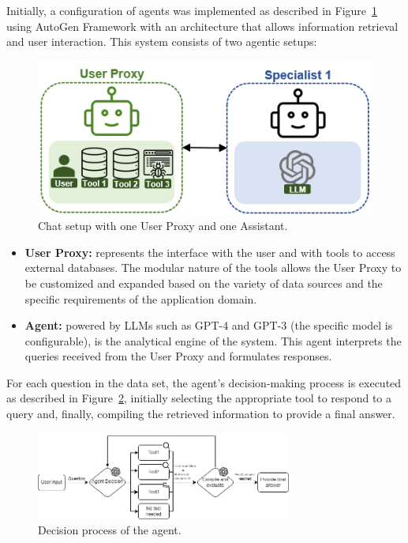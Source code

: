             Initially, a configuration of agents was implemented as described in Figure~\ref{fig:agent_config_1} using AutoGen Framework \citep{Wu2023} with an architecture that allows information retrieval and user interaction. This system consists of two agentic setups:

            \begin{figure}[h]
                \centering
                \includegraphics[width=.5\textwidth]{images/agent_config_1.png}
                \caption{Chat setup with one User Proxy \citep{Wu2023} and one Assistant.}
                \label{fig:agent_config_1}
            \end{figure}

            \begin{itemize}        
                        
                \item \textbf{User Proxy:} represents the interface with the user and with tools to access external databases. The modular nature of the tools allows the User Proxy to be customized and expanded based on the variety of data sources and the specific requirements of the application domain.

                \item \textbf{Agent:} powered by LLMs such as GPT-4 and GPT-3 (the specific model is configurable), is the analytical engine of the system. This agent interprets the queries received from the User Proxy and formulates responses.
                                    
            \end{itemize}

            
            For each question in the data set, the agent's decision-making process is executed as described in Figure~\ref{fig:diagrama_agente_1}, initially selecting the appropriate tool to respond to a query and, finally, compiling the retrieved information to provide a final answer.

            \begin{figure}[h]
                \centering
                \includegraphics[width=0.75\textwidth]{images/agent_diagram_1.png}
                \caption{Decision process of the agent.}
                \label{fig:diagrama_agente_1}
            \end{figure}

